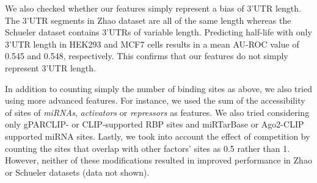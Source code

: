 We also checked whether our features simply represent a bias of 3'UTR length. The 3'UTR segments in Zhao dataset are all of the same length whereas the Schueler dataset contains 3'UTRs of variable length. Predicting half-life with only 3'UTR length in HEK293 and MCF7 cells results in a mean AU-ROC value of 0.545 and 0.548, respectively. This confirms that our features do not simply represent 3'UTR length.

In addition to counting simply the number of binding sites as above, we also tried using more advanced features. For instance, we used the sum of the accessibility of sites of \textit{miRNAs}, \textit{activators} or \textit{repressors} as features. We also tried considering only gPARCLIP- or CLIP-supported RBP sites and miRTarBase or Ago2-CLIP supported miRNA sites. Lastly, we took into account the effect of competition by counting the sites that overlap with other factors' sites as 0.5 rather than 1. However, neither of these modifications resulted in improved performance in Zhao or Schueler datasets (data not shown).